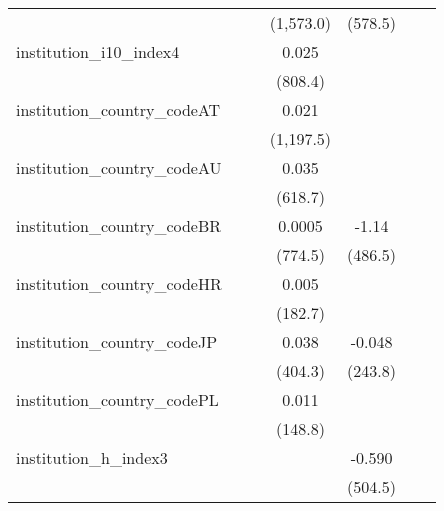 \begin{tabular}{lcccccc}
                                         &              &              & (1,573.0)      & (578.5)        &     &   \\   
   institution\_i10\_index4              &              &              & 0.025          &                &     &   \\   
                                         &              &              & (808.4)        &                &     &   \\   
   institution\_country\_codeAT          &              &              & 0.021          &                &     &   \\   
                                         &              &              & (1,197.5)      &                &     &   \\   
   institution\_country\_codeAU          &              &              & 0.035          &                &     &   \\   
                                         &              &              & (618.7)        &                &     &   \\   
   institution\_country\_codeBR          &              &              & 0.0005         & -1.14          &     &   \\   
                                         &              &              & (774.5)        & (486.5)        &     &   \\   
   institution\_country\_codeHR          &              &              & 0.005          &                &     &   \\   
                                         &              &              & (182.7)        &                &     &   \\   
   institution\_country\_codeJP          &              &              & 0.038          & -0.048         &     &   \\   
                                         &              &              & (404.3)        & (243.8)        &     &   \\   
   institution\_country\_codePL          &              &              & 0.011          &                &     &   \\   
                                         &              &              & (148.8)        &                &     &   \\   
   institution\_h\_index3                &              &              &                & -0.590         &     &   \\   
                                         &              &              &                & (504.5)        &     &   \\   

\end{tabular}
